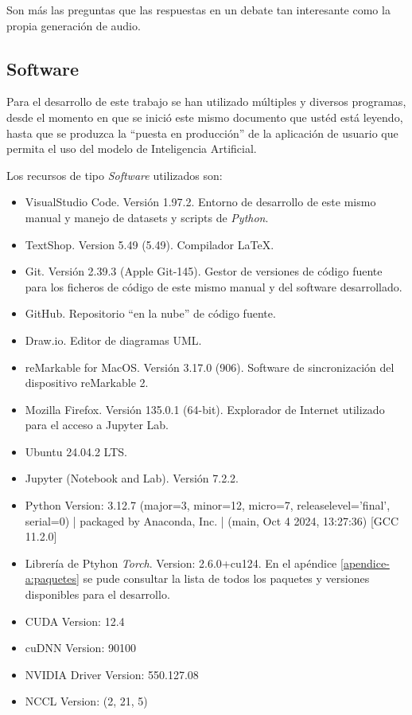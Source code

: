 Son más las preguntas que las respuestas en un debate tan interesante como la propia generación de audio.

\subsection{Software}

Para el desarrollo de este trabajo se han utilizado múltiples y diversos programas, desde el momento en que se inició este mismo documento que ustéd está leyendo, hasta que se produzca la ``puesta en producción'' de la aplicación de usuario que permita el uso del modelo de Inteligencia Artificial.

Los recursos de tipo \emph{Software} utilizados son:

\begin{itemize}
    \item VisualStudio Code. Versión 1.97.2. Entorno de desarrollo de este mismo manual y manejo de datasets y scripts de \emph{Python}.
    \item TextShop. Version 5.49 (5.49). Compilador \LaTeX.
    \item Git. Versión 2.39.3 (Apple Git-145). Gestor de versiones de código fuente para los ficheros de código de este mismo manual y del software desarrollado.
    \item GitHub. Repositorio ``en la nube'' de código fuente.
    \item Draw.io. Editor de diagramas UML.
    \item reMarkable for MacOS. Versión 3.17.0 (906). Software de sincronización del dispositivo reMarkable 2.
    \item Mozilla Firefox. Versión 135.0.1 (64-bit). Explorador de Internet utilizado para el acceso a Jupyter Lab.
    \item Ubuntu 24.04.2 LTS.
    \item Jupyter (Notebook and Lab). Versión 7.2.2.
    \item Python Version: 3.12.7 (major=3, minor=12, micro=7, releaselevel='final', serial=0) | packaged by Anaconda, Inc. | (main, Oct  4 2024, 13:27:36) [GCC 11.2.0]
    \item Librería de Ptyhon \emph{Torch}. Version: 2.6.0+cu124. En el apéndice \ref{apendice-a:paquetes} se pude consultar la lista de todos los paquetes y versiones disponibles para el desarrollo.
    \item CUDA Version: 12.4
    \item cuDNN Version: 90100
    \item NVIDIA Driver Version: 550.127.08
    \item NCCL Version: (2, 21, 5)
\end{itemize}

